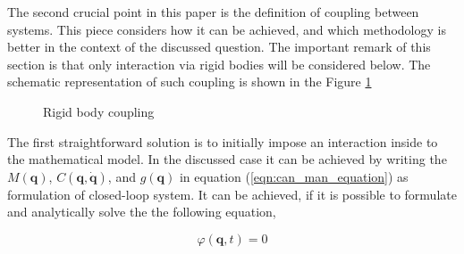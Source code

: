 The second crucial point in this paper is the definition of coupling between
systems. This piece considers how it can be achieved, and which methodology
is better in the context of the discussed question. The important remark of this
section is that only interaction via rigid bodies will be considered below.
The schematic representation of such coupling is shown in the Figure
\ref{fig:rigid_coupling}


\begin{figure}[H]
   \centering
   \caption{Rigid body coupling}
   \label{fig:rigid_coupling}
\end{figure}


The first straightforward solution is to initially impose an interaction inside
to the mathematical model. In the discussed case it can be achieved by writing
the $M(\mathbf{q})$, $C(\mathbf{q}, \dot{\mathbf{q}})$, and $g(\mathbf{q})$
in equation (\ref{eqn:can_man_equation}) as formulation of closed-loop system.
It can be achieved, if it is possible to formulate and analytically solve the
the following equation,


\begin{equation}
   \label{eqn:holonom_const}
   \varphi (\mathbf{q}, t) = 0
\end{equation}




